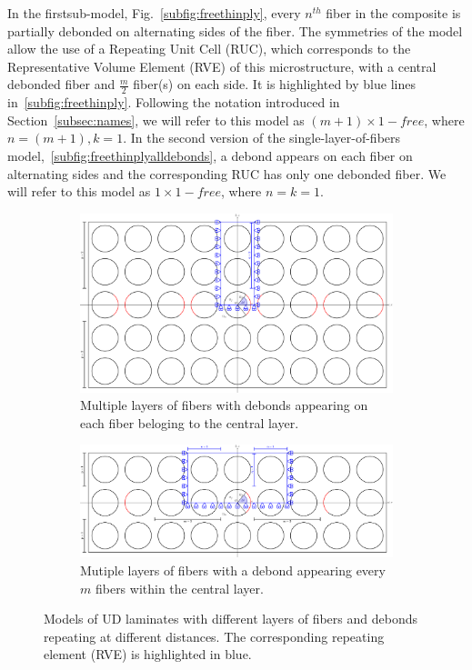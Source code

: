 \documentclass[review]{elsarticle}
\begin{document}
In the firstsub-model, Fig.~\ref{subfig:freethinply}, every $n^{th}$ fiber in the composite is partially debonded on alternating sides of the fiber. The symmetries of the model allow the use of a Repeating Unit Cell (RUC), which corresponds to the Representative Volume Element (RVE) of this microstructure, with a central debonded fiber and $\frac{m}{2}$ fiber(s) on each side. It is highlighted by blue lines in~\ref{subfig:freethinply}. Following the notation introduced in Section~\ref{subsec:names}, we will refer to this model as $\left(m+1\right)\times 1-free$, where $n=\left(m+1\right), k=1$. In the second version of the single-layer-of-fibers model,~\ref{subfig:freethinplyalldebonds}, a debond appears on each fiber on alternating sides and the corresponding RUC has only one debonded fiber. We will refer to this model as $1\times 1-free$, where $n=k=1$.

\begin{figure}[!h]
\centering
    \begin{subfigure}[b]{\textwidth}
    \centering
        \includegraphics[height=0.3\textheight]{thickPlycentraldebondsline.pdf}
        \caption{Multiple layers of fibers with debonds appearing on each fiber beloging to the central layer.}\label{subfig:thickplycentraldebonds}
    \end{subfigure} 

    \begin{subfigure}[b]{\textwidth}
        \includegraphics[width=\textwidth]{thickPly.pdf}
        \caption{Mutiple layers of fibers with a debond appearing every $m$ fibers within the central layer.}\label{subfig:thickply}
    \end{subfigure} 

\caption{Models of UD laminates with different layers of fibers and debonds repeating at different distances. The corresponding repeating element (RVE) is highlighted in blue.}\label{fig:laminateModelsB}
\end{figure}
\end{document}
